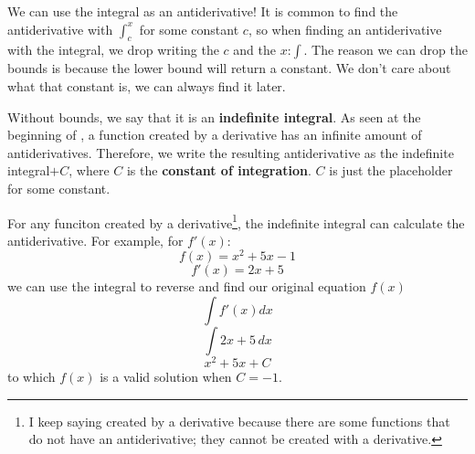 \documentclass[../revisedmain.tex]{subfiles}
\begin{document}
We can use the integral as an antiderivative! It is common to find the antiderivative with $\int_{c}^{x}$ for some constant $c$, so when finding an antiderivative with the integral, we drop writing the $c$ and the $x$:$\int$. The reason we can drop the bounds is because the lower bound will return a constant. We don't care about what that constant is, we can always find it later. \\\par Without bounds, we say that it is an \textbf{indefinite integral}. As seen at the beginning of , a function created by a derivative has an infinite amount of antiderivatives. Therefore, we write the resulting antiderivative as the indefinite integral$+C$, where $C$ is the \textbf{constant of integration}. $C$ is just the placeholder for some constant.\\\par For any funciton created by a derivative\footnote{I keep saying created by a derivative because there are some functions that do not have an antiderivative; they cannot be created with a derivative.}, the indefinite integral can calculate the antiderivative. For example, for $f'(x)$:$$f(x)=x^2+5x-1$$$$f'(x)=2x+5$$we can use the integral to reverse and find our original equation $f(x)$$$\int f'(x)dx$$$$\int 2x+5\,dx$$$$x^2+5x+C$$to which $f(x)$ is a valid solution when $C=-1$.\\
\end{document}
